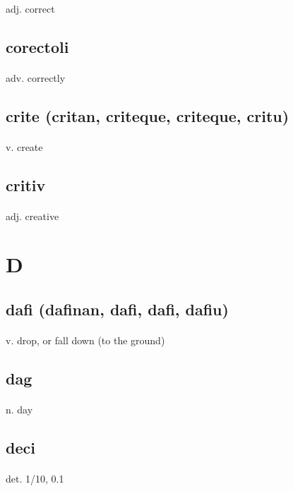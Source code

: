 \documentclass[UTF8]{article}
\begin{document}
    \paragraph{} adj. correct
    \subsection{corectoli}
    \paragraph{} adv. correctly
    \subsection{crite (critan, criteque, criteque, critu)}
    \paragraph{} v. create
    \subsection{critiv}
    \paragraph{} adj. creative
    \newpage \section{D}
    \subsection{dafi (dafinan, dafi, dafi, dafiu)}
    \paragraph{} v. drop, or fall down (to the ground) 
    \subsection{dag}
    \paragraph{} n. day 
    \subsection{deci}
    \paragraph{} det. 1/10, 0.1 
\end{document}
